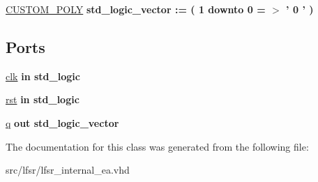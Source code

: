 \begin{DoxyCompactItemize}
\item 
\hypertarget{classlfsr__internal_a7d64141a514f3177a611abb7f25e6f6f}{\hyperlink{classlfsr__internal_a7d64141a514f3177a611abb7f25e6f6f}{C\-U\-S\-T\-O\-M\-\_\-\-P\-O\-L\-Y} {\bfseries {\bfseries \textcolor{comment}{std\-\_\-logic\-\_\-vector}\textcolor{vhdlchar}{ }\textcolor{vhdlchar}{\-:}\textcolor{vhdlchar}{=}\textcolor{vhdlchar}{ }\textcolor{vhdlchar}{(}\textcolor{vhdlchar}{ }\textcolor{vhdlchar}{ } \textcolor{vhdldigit}{1} \textcolor{vhdlchar}{ }\textcolor{vhdlchar}{ }\textcolor{vhdlchar}{ }\textcolor{vhdlkeyword}{downto}\textcolor{vhdlchar}{ }\textcolor{vhdlchar}{ }\textcolor{vhdlchar}{ } \textcolor{vhdldigit}{0} \textcolor{vhdlchar}{ }\textcolor{vhdlchar}{ }\textcolor{vhdlchar}{=}\textcolor{vhdlchar}{ }\textcolor{vhdlchar}{$>$}\textcolor{vhdlchar}{ }\textcolor{vhdlchar}{'}\textcolor{vhdlchar}{ } \textcolor{vhdldigit}{0} \textcolor{vhdlchar}{ }\textcolor{vhdlchar}{'}\textcolor{vhdlchar}{ }\textcolor{vhdlchar}{ }\textcolor{vhdlchar}{)}\textcolor{vhdlchar}{ }}}}\label{classlfsr__internal_a7d64141a514f3177a611abb7f25e6f6f}

\end{DoxyCompactItemize}
\subsection*{Ports}
 \begin{DoxyCompactItemize}
\item 
\hypertarget{classlfsr__internal_aec59ad7fb872308b3e1a455c5328cdff}{\hyperlink{classlfsr__internal_aec59ad7fb872308b3e1a455c5328cdff}{clk}  {\bfseries {\bfseries \textcolor{vhdlkeyword}{in}\textcolor{vhdlchar}{ }}} {\bfseries \textcolor{comment}{std\-\_\-logic}\textcolor{vhdlchar}{ }} }\label{classlfsr__internal_aec59ad7fb872308b3e1a455c5328cdff}

\item 
\hypertarget{classlfsr__internal_a5cf3e8e1cb15fcfc3619d8dc23942d9c}{\hyperlink{classlfsr__internal_a5cf3e8e1cb15fcfc3619d8dc23942d9c}{rst}  {\bfseries {\bfseries \textcolor{vhdlkeyword}{in}\textcolor{vhdlchar}{ }}} {\bfseries \textcolor{comment}{std\-\_\-logic}\textcolor{vhdlchar}{ }} }\label{classlfsr__internal_a5cf3e8e1cb15fcfc3619d8dc23942d9c}

\item 
\hypertarget{classlfsr__internal_a4b652fca0dff23dedf468470a5d9142c}{\hyperlink{classlfsr__internal_a4b652fca0dff23dedf468470a5d9142c}{q}  {\bfseries {\bfseries \textcolor{vhdlkeyword}{out}\textcolor{vhdlchar}{ }}} {\bfseries \textcolor{comment}{std\-\_\-logic\-\_\-vector}\textcolor{vhdlchar}{ }} }\label{classlfsr__internal_a4b652fca0dff23dedf468470a5d9142c}

\end{DoxyCompactItemize}


The documentation for this class was generated from the following file\-:\begin{DoxyCompactItemize}
\item 
src/lfsr/lfsr\-\_\-internal\-\_\-ea.\-vhd\end{DoxyCompactItemize}
